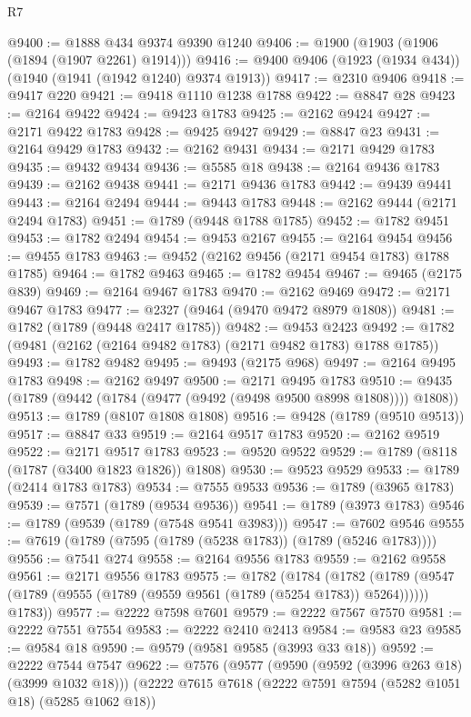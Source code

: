 \begin{lexlean}{R7}
\begin{coremodule}
@9400 := @1888 @434 @9374 @9390 @1240
@9406 := @1900 (@1903 (@1906 (@1894 (@1907 @2261) @1914)))
@9416 := @9400 @9406 (@1923 (@1934 @434)) (@1940 (@1941 (@1942 @1240) @9374 @1913))
@9417 := @2310 @9406
@9418 := @9417 @220
@9421 := @9418 @1110 @1238 @1788
@9422 := @8847 @28
@9423 := @2164 @9422
@9424 := @9423 @1783
@9425 := @2162 @9424
@9427 := @2171 @9422 @1783
@9428 := @9425 @9427
@9429 := @8847 @23
@9431 := @2164 @9429 @1783
@9432 := @2162 @9431
@9434 := @2171 @9429 @1783
@9435 := @9432 @9434
@9436 := @5585 @18
@9438 := @2164 @9436 @1783
@9439 := @2162 @9438
@9441 := @2171 @9436 @1783
@9442 := @9439 @9441
@9443 := @2164 @2494
@9444 := @9443 @1783
@9448 := @2162 @9444 (@2171 @2494 @1783)
@9451 := @1789 (@9448 @1788 @1785)
@9452 := @1782 @9451
@9453 := @1782 @2494
@9454 := @9453 @2167
@9455 := @2164 @9454
@9456 := @9455 @1783
@9463 := @9452 (@2162 @9456 (@2171 @9454 @1783) @1788 @1785)
@9464 := @1782 @9463
@9465 := @1782 @9454
@9467 := @9465 (@2175 @839)
@9469 := @2164 @9467 @1783
@9470 := @2162 @9469
@9472 := @2171 @9467 @1783
@9477 := @2327 (@9464 (@9470 @9472 @8979 @1808))
@9481 := @1782 (@1789 (@9448 @2417 @1785))
@9482 := @9453 @2423
@9492 := @1782 (@9481 (@2162 (@2164 @9482 @1783) (@2171 @9482 @1783) @1788 @1785))
@9493 := @1782 @9482
@9495 := @9493 (@2175 @968)
@9497 := @2164 @9495 @1783
@9498 := @2162 @9497
@9500 := @2171 @9495 @1783
@9510 := @9435 (@1789 (@9442 (@1784 (@9477 (@9492 (@9498 @9500 @8998 @1808)))) @1808))
@9513 := @1789 (@8107 @1808 @1808)
@9516 := @9428 (@1789 (@9510 @9513))
@9517 := @8847 @33
@9519 := @2164 @9517 @1783
@9520 := @2162 @9519
@9522 := @2171 @9517 @1783
@9523 := @9520 @9522
@9529 := @1789 (@8118 (@1787 (@3400 @1823 @1826)) @1808)
@9530 := @9523 @9529
@9533 := @1789 (@2414 @1783 @1783)
@9534 := @7555 @9533
@9536 := @1789 (@3965 @1783)
@9539 := @7571 (@1789 (@9534 @9536))
@9541 := @1789 (@3973 @1783)
@9546 := @1789 (@9539 (@1789 (@7548 @9541 @3983)))
@9547 := @7602 @9546
@9555 := @7619 (@1789 (@7595 (@1789 (@5238 @1783)) (@1789 (@5246 @1783))))
@9556 := @7541 @274
@9558 := @2164 @9556 @1783
@9559 := @2162 @9558
@9561 := @2171 @9556 @1783
@9575 := @1782
    (@1784
      (@1782
        (@1789 (@9547 (@1789 (@9555 (@1789 (@9559 @9561 (@1789 (@5254 @1783)) @5264))))))
        @1783))
@9577 := @2222 @7598 @7601
@9579 := @2222 @7567 @7570
@9581 := @2222 @7551 @7554
@9583 := @2222 @2410 @2413
@9584 := @9583 @23
@9585 := @9584 @18
@9590 := @9579 (@9581 @9585 (@3993 @33 @18))
@9592 := @2222 @7544 @7547
@9622 := @7576
    (@9577
      (@9590 (@9592 (@3996 @263 @18) (@3999 @1032 @18)))
      (@2222
        @7615
        @7618
        (@2222 @7591 @7594 (@5282 @1051 @18) (@5285 @1062 @18))

\end{coremodule}
\end{lexlean}
